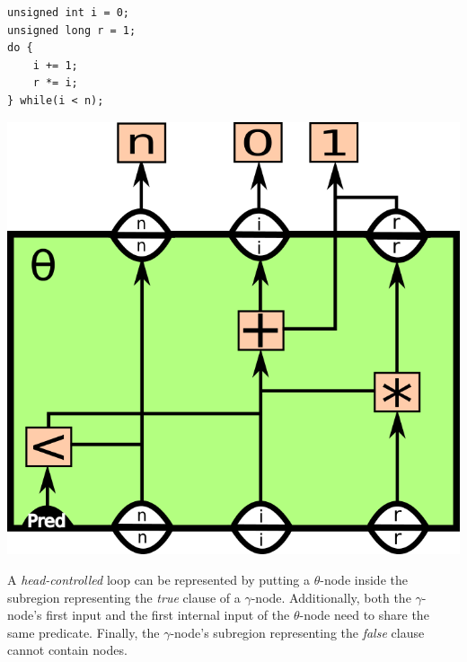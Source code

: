 \begin{itemize}
\begin{centering}
	\noindent\begin{minipage}{0.36\textwidth}
		\begin{CenteredBox}
		\begin{lstlisting}[style=minipage_customcpp,
label={lst:fig:factorial_loop_ex}, basicstyle=\fontsize{10}{1}]
unsigned int i = 0;
unsigned long r = 1;
do {
	i += 1;
	r *= i;
} while(i < n);
		\end{lstlisting}
		\end{CenteredBox}
	\end{minipage}
	\noindent\begin{minipage}{0.55\textwidth}
		\captionsetup{type=figure}
		\includegraphics[width=\textwidth]{figures/iterative_factorial_ex}
	\end{minipage}
	\label{fig:factorial_loop_ex}
\end{centering}

A \textit{head-controlled} loop can be represented by putting a $\theta$-node
inside the subregion representing the \textit{true } clause of a $\gamma$-node.
Additionally, both the $\gamma$-node's first input and the first internal input
of the $\theta$-node need to share the same predicate. Finally, the
$\gamma$-node's subregion representing the \textit{false} clause cannot contain
nodes.


\end{itemize}

